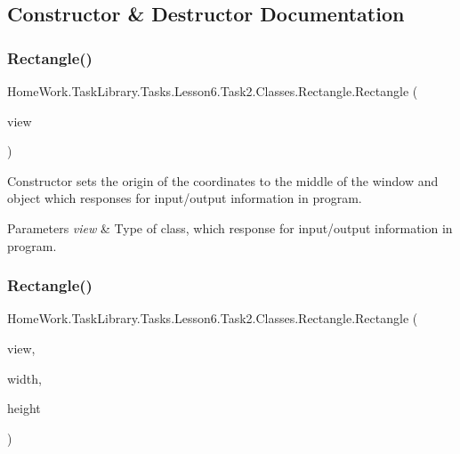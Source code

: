 \subsection{Constructor \& Destructor Documentation}
\mbox{\label{class_home_work_1_1_task_library_1_1_tasks_1_1_lesson6_1_1_task2_1_1_classes_1_1_rectangle_a313caff81907bf6d090eae92bd05a6c6}} 
\subsubsection{\texorpdfstring{Rectangle()}{Rectangle()}\hspace{0.1cm}{\footnotesize\ttfamily [1/3]}}
{\footnotesize\ttfamily Home\+Work.\+Task\+Library.\+Tasks.\+Lesson6.\+Task2.\+Classes.\+Rectangle.\+Rectangle (\begin{DoxyParamCaption}\item[{I\+Information}]{view }\end{DoxyParamCaption})}



Constructor sets the origin of the coordinates to the middle of the window and object which responses for input/output information in program. 


\begin{DoxyParams}{Parameters}
{\em view} & Type of class, which response for input/output information in program.\\
\hline
\end{DoxyParams}
\mbox{\label{class_home_work_1_1_task_library_1_1_tasks_1_1_lesson6_1_1_task2_1_1_classes_1_1_rectangle_a637165b92a83437a2c169293dc7641e6}} 
\subsubsection{\texorpdfstring{Rectangle()}{Rectangle()}\hspace{0.1cm}{\footnotesize\ttfamily [2/3]}}
{\footnotesize\ttfamily Home\+Work.\+Task\+Library.\+Tasks.\+Lesson6.\+Task2.\+Classes.\+Rectangle.\+Rectangle (\begin{DoxyParamCaption}\item[{I\+Information}]{view,  }\item[{int}]{width,  }\item[{int}]{height }\end{DoxyParamCaption})}



